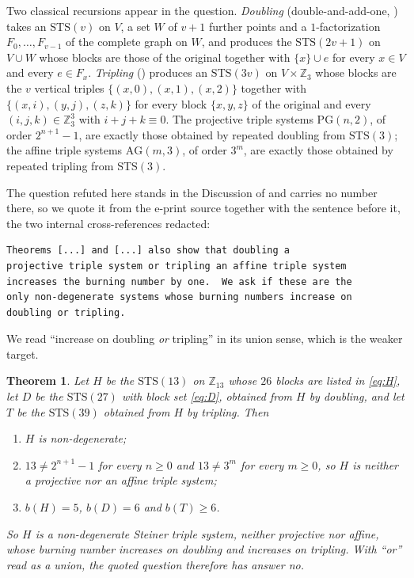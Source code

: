 \documentclass[11pt]{amsart}
\newtheorem{theorem}{Theorem}
\newcommand{\STS}{\mathrm{STS}}
\newcommand{\PG}{\mathrm{PG}}
\newcommand{\AG}{\mathrm{AG}}
\begin{document}
Two classical recursions appear in the question. \emph{Doubling}
(double-and-add-one, \cite[Construction~2.15]{Handbook}) takes an $\STS(v)$ on
$V$, a set $W$ of $v+1$ further points and a $1$-factorization
$F_0,\dots,F_{v-1}$ of the complete graph on $W$, and produces the $\STS(2v+1)$
on $V\cup W$ whose blocks are those of the original together with
$\{x\}\cup e$ for every $x\in V$ and every $e\in F_x$. \emph{Tripling}
(\cite[Construction~2.17]{Handbook}) produces an $\STS(3v)$ on $V\times\mathbb
Z_3$ whose blocks are the $v$ vertical triples
$\{(x,0),(x,1),(x,2)\}$ together with
$\{(x,i),(y,j),(z,k)\}$ for every block $\{x,y,z\}$ of the original and every
$(i,j,k)\in\mathbb Z_3^3$ with $i+j+k\equiv0$. The projective triple systems
$\PG(n,2)$, of order $2^{n+1}-1$, are exactly those obtained by repeated
doubling from $\STS(3)$; the affine triple systems $\AG(m,3)$, of order $3^m$,
are exactly those obtained by repeated tripling from $\STS(3)$.

The question refuted here stands in the Discussion of \cite{BDJMP} and carries
no number there, so we quote it from the e-print source together with the
sentence before it, the two internal cross-references redacted:

\begin{footnotesize}
\begin{verbatim}
Theorems [...] and [...] also show that doubling a
projective triple system or tripling an affine triple system
increases the burning number by one.  We ask if these are the
only non-degenerate systems whose burning numbers increase on
doubling or tripling.
\end{verbatim}
\end{footnotesize}

\noindent
We read ``increase on doubling \emph{or} tripling'' in its union sense, which
is the weaker target.

\begin{theorem}\label{thm:main}
Let $H$ be the $\STS(13)$ on $\mathbb Z_{13}$ whose $26$ blocks are listed in
\eqref{eq:H}, let $D$ be the $\STS(27)$ with block set \eqref{eq:D}, obtained
from $H$ by doubling, and let $T$ be the $\STS(39)$ obtained from $H$ by
tripling. Then
\begin{enumerate}
\item[(a)] $H$ is non-degenerate;
\item[(b)] $13\ne2^{n+1}-1$ for every $n\ge0$ and $13\ne3^{m}$ for every
      $m\ge0$, so $H$ is neither a projective nor an affine triple system;
\item[(c)] $b(H)=5$, $b(D)=6$ and $b(T)\ge6$.
\end{enumerate}
So $H$ is a non-degenerate Steiner triple system, neither projective nor
affine, whose burning number increases on doubling and increases on tripling.
With ``or'' read as a union, the quoted question therefore has answer no.
\end{theorem}
\end{document}
